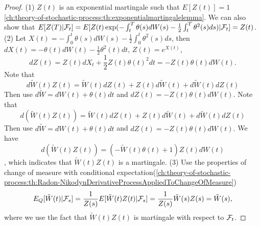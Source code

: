 \begin{refsection}
\begin{theorem}
\begin{itemize}
	\end{itemize}
\end{theorem}
\begin{proof}
	(1) $Z(t)$ is an exponential martingale such that $E[Z(t)] = 1$ \autoref{ch:theory-of-stochastic-process:th:exponentialmartingalelemma}.
	We can also show that
	$E[Z(T)|\mathcal{F}_t] = E[Z(t)\exp(-\int_t^T \theta(s)dW(s) - \frac{1}{2}\int_t^T \theta^2(s)ds)|\mathcal{F}_t] = Z(t)$.
	(2)
	Let $X(t) = -\int_0^t \theta(s)dW(s) - \frac{1}{2}\int_0^t \theta^2(s)ds$, then $dX(t) = -\theta(t)dW(t) - \frac{1}{2} \theta^2(t)dt$, $Z(t) = e^{X(t)}$, $$dZ(t) = Z(t)dX_t + \frac{1}{2}Z(t)\theta(t)^2 dt = -Z(t)\theta(t)dW(t). $$
	Note that
	$$d\tilde{W}(t)Z(t) = \tilde{W}(t)dZ(t) + Z(t)d\tilde{W}(t) + d\tilde{W}(t) dZ(t)$$
	Then use  $d\tilde{W} = dW(t) + \theta(t)dt$ and $ dZ(t) = -Z(t)\theta(t)dW(t).$
	Note that
	$$d(\tilde{W}(t)Z(t)) = \tilde{W}(t)dZ(t) + Z(t)d\tilde{W}(t) + d\tilde{W}(t) dZ(t)$$
	Then use  $d\tilde{W} = dW(t) + \theta(t)dt$ and $ dZ(t) = -Z(t)\theta(t)dW(t).$
	We have
	$$d(\tilde{W}(t)Z(t)) = (-\tilde{W}(t)\theta(t) + 1)Z(t)dW(t)$$, which indicates that $\tilde{W}(t)Z(t)$ is a martingale.
	(3) 
	Use the properties of change of measure with conditional expectation(\autoref{ch:theory-of-stochastic-process:th:Radon-NikodynDerivativeProcessAppliedToChangeOfMeasure})
	$$E_Q[\tilde{W}(t)|\mathcal{F}_s] = \frac{1}{Z(s)} E[\tilde{W}(t)Z(t)|\mathcal{F}_s] = \frac{1}{Z(s)}\tilde{W}(s)Z(s) = \tilde{W}(s),$$
	where we use the fact that $\tilde{W}(t)Z(t)$ is martingale with respect to $\mathcal{F}_t$.
	
	
	

\end{proof}
\end{refsection}
